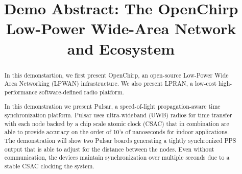 \documentclass[conference]{IEEEtran}
\begin{document}
\title{Demo Abstract: The OpenChirp Low-Power Wide-Area Network and Ecosystem}
\author{
}


% 








\maketitle

\begin{abstract}

In this demonstartion, we first present OpenChirp, an open-source Low-Power Wide
Area Networking (LPWAN) infrastructure.
We also present LPRAN, a low-cost high-performance software-defined radio
platform.


In this demonstration we present Pulsar, a speed-of-light propagation-aware
time synchronization platform. Pulsar uses ultra-wideband (UWB) radios for
time transfer with each node backed by a chip scale atomic clock (CSAC) that
in combination are able to provide accuracy on the order of 10's of
nanoseconds for indoor applications. The demonstration will show two Pulsar
boards generating a tightly synchronized PPS output that is able to adjust for
the distance between the nodes. Even without communication, the devices
maintain synchronization over multiple seconds due to a stable CSAC clocking
the system.
\end{abstract}
\end{document}
